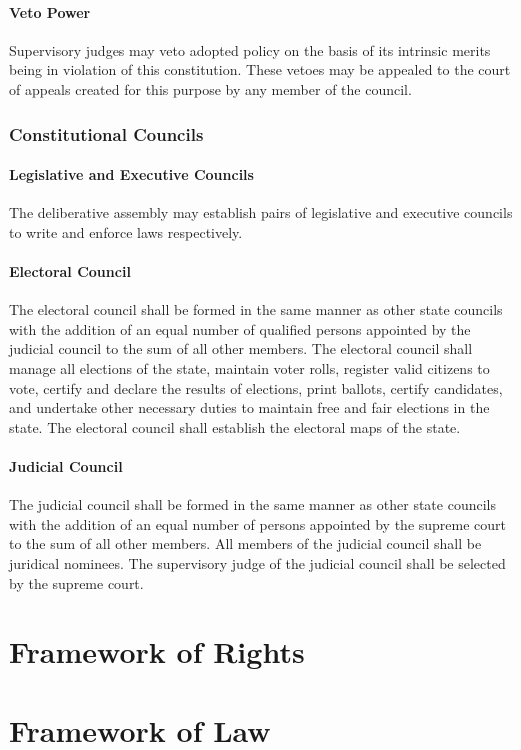 \documentclass{article}
\begin{document}
\paragraph{Veto Power}
Supervisory judges may veto adopted policy on the basis of its intrinsic merits being in violation of this constitution. These vetoes may be appealed to the court of appeals created for this purpose by any member of the council.
\subsubsection{Constitutional Councils}
\paragraph{Legislative and Executive Councils}
The deliberative assembly may establish pairs of legislative and executive councils to write and enforce laws respectively. 
\paragraph{Electoral Council}
The electoral council shall be formed in the same manner as other state councils with the addition of an equal number of qualified persons appointed by the judicial council to the sum of all other members. The electoral council shall manage all elections of the state, maintain voter rolls, register valid citizens to vote, certify and declare the results of elections, print ballots, certify candidates, and undertake other necessary duties to maintain free and fair elections in the state. The electoral council shall establish the electoral maps of the state.
\paragraph{Judicial Council}
The judicial council shall be formed in the same manner as other state councils with the addition of an equal number of persons appointed by the supreme court to the sum of all other members. All members of the judicial council shall be juridical nominees. The supervisory judge of the judicial council shall be selected by the supreme court.
\section{Framework of Rights}
\section{Framework of Law}
\end{document}
